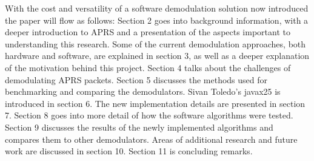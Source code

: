 With the cost and versatility of a software demodulation solution now introduced the paper will flow as follows: Section 2 goes into background information, with a deeper introduction to APRS and a presentation of the aspects important to understanding this research. Some of the current demodulation approaches, both hardware and software, are explained in section 3, as well as a deeper explanation of the motivation behind this project. Section 4 talks about the challenges of demodulating APRS packets. Section 5 discusses the methods used for benchmarking and comparing the demodulators. Sivan Toledo's javax25 is introduced in section 6. The new implementation details are presented in section 7. Section 8 goes into more detail of how the software algorithms were tested. Section 9 discusses the results of the newly implemented algorithms and compares them to other demodulators. Areas of additional research and future work are discussed in section 10. Section 11 is concluding remarks.